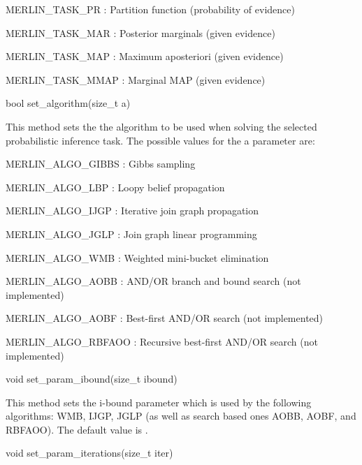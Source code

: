 \begin{DoxyItemize}
\item {\ttfamily M\+E\+R\+L\+I\+N\+\_\+\+T\+A\+S\+K\+\_\+\+P\+R} \+: Partition function (probability of evidence)
\item {\ttfamily M\+E\+R\+L\+I\+N\+\_\+\+T\+A\+S\+K\+\_\+\+M\+A\+R} \+: Posterior marginals (given evidence)
\item {\ttfamily M\+E\+R\+L\+I\+N\+\_\+\+T\+A\+S\+K\+\_\+\+M\+A\+P} \+: Maximum aposteriori (given evidence)
\item {\ttfamily M\+E\+R\+L\+I\+N\+\_\+\+T\+A\+S\+K\+\_\+\+M\+M\+A\+P} \+: Marginal M\+A\+P (given evidence) \begin{DoxyVerb}  bool set_algorithm(size_t a)
\end{DoxyVerb}
 This method sets the the algorithm to be used when solving the selected probabilistic inference task. The possible values for the {\ttfamily a} parameter are\+:
\item {\ttfamily M\+E\+R\+L\+I\+N\+\_\+\+A\+L\+G\+O\+\_\+\+G\+I\+B\+B\+S} \+: Gibbs sampling
\item {\ttfamily M\+E\+R\+L\+I\+N\+\_\+\+A\+L\+G\+O\+\_\+\+L\+B\+P} \+: Loopy belief propagation
\item {\ttfamily M\+E\+R\+L\+I\+N\+\_\+\+A\+L\+G\+O\+\_\+\+I\+J\+G\+P} \+: Iterative join graph propagation
\item {\ttfamily M\+E\+R\+L\+I\+N\+\_\+\+A\+L\+G\+O\+\_\+\+J\+G\+L\+P} \+: Join graph linear programming
\item {\ttfamily M\+E\+R\+L\+I\+N\+\_\+\+A\+L\+G\+O\+\_\+\+W\+M\+B} \+: Weighted mini-\/bucket elimination
\item {\ttfamily M\+E\+R\+L\+I\+N\+\_\+\+A\+L\+G\+O\+\_\+\+A\+O\+B\+B} \+: A\+N\+D/\+O\+R branch and bound search (not implemented)
\item {\ttfamily M\+E\+R\+L\+I\+N\+\_\+\+A\+L\+G\+O\+\_\+\+A\+O\+B\+F} \+: Best-\/first A\+N\+D/\+O\+R search (not implemented)
\item {\ttfamily M\+E\+R\+L\+I\+N\+\_\+\+A\+L\+G\+O\+\_\+\+R\+B\+F\+A\+O\+O} \+: Recursive best-\/first A\+N\+D/\+O\+R search (not implemented) \begin{DoxyVerb}  void set_param_ibound(size_t ibound)
\end{DoxyVerb}
 This method sets the i-\/bound parameter which is used by the following algorithms\+: {\ttfamily W\+M\+B}, {\ttfamily I\+J\+G\+P}, {\ttfamily J\+G\+L\+P} (as well as search based ones {\ttfamily A\+O\+B\+B}, {\ttfamily A\+O\+B\+F}, and {\ttfamily R\+B\+F\+A\+O\+O}). The default value is {}. \begin{DoxyVerb}    void set_param_iterations(size_t iter)

\end{DoxyVerb}
\end{DoxyItemize}
